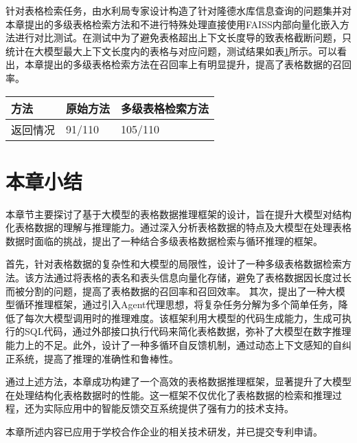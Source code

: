 针对表格检索任务，由水利局专家设计构造了针对隆德水库信息查询的问题集并对本章提出的多级表格检索方法和不进行特殊处理直接使用FAISS内部向量化嵌入方法进行对比测试。在测试中为了避免表格超出上下文长度导的致表格截断问题，只统计在大模型最大上下文长度内的表格与对应问题，测试结果如表\ref{tab:table-retrival-results}所示。可以看出，本章提出的多级表格检索方法在召回率上有明显提升，提高了表格数据的召回率。
\begin{table}[htbp]
    \centering
    \label{tab:table-retrival-results}
    \begin{tabularx}{\linewidth}{XXX}
        \toprule[1.5pt]
        \textbf{方法} & \textbf{原始方法} & \textbf{多级表格检索方法} \\
        \midrule[1pt]
        返回情况 & 91/110 & 105/110 \\
        \bottomrule[1.5pt]
    \end{tabularx}
\end{table}

\section{本章小结}
本章节主要探讨了基于大模型的表格数据推理框架的设计，旨在提升大模型对结构化表格数据的理解与推理能力。通过深入分析表格数据的特点及大模型在处理表格数据时面临的挑战，提出了一种结合多级表格数据检索与循环推理的框架。

首先，针对表格数据的复杂性和大模型的局限性，设计了一种多级表格数据检索方法。该方法通过将表格的表名和表头信息向量化存储，避免了表格数据因长度过长而被分割的问题，提高了表格数据的召回率和召回效率。
其次，提出了一种大模型循环推理框架，通过引入Agent代理思想，将复杂任务分解为多个简单任务，降低了每次大模型调用时的推理难度。该框架利用大模型的代码生成能力，生成可执行的SQL代码，通过外部接口执行代码来简化表格数据，弥补了大模型在数字推理能力上的不足。此外，设计了一种多循环自反馈机制，通过动态上下文感知的自纠正系统，提高了推理的准确性和鲁棒性。

通过上述方法，本章成功构建了一个高效的表格数据推理框架，显著提升了大模型在处理结构化表格数据时的性能。这一框架不仅优化了表格数据的检索和推理过程，还为实际应用中的智能反馈交互系统提供了强有力的技术支持。

本章所述内容已应用于学校合作企业的相关技术研发，并已提交专利申请。
